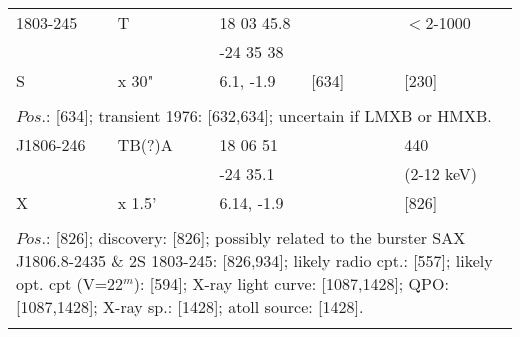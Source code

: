 \documentclass{aa}
\begin{document}
\begin{tabular}{p{2.5cm}p{1cm}p{1.8cm}p{2.3cm}p{3.3cm}p{2.0cm}p{2.2cm}}
\noalign{\smallskip}
1803-245        & T                  & 18 03 45.8         &                      &                          & $<$2-1000      &            \\
                         &                      & -24 35 38           &                      &                          &                          &            \\
      S                & x 30"            & 6.1, -1.9             &  [634]           &                          & [230]                &            \\
\\
\multicolumn{7}{p{17.5cm}}{
$Pos$.: [634]; transient 1976: [632,634]; uncertain if LMXB or HMXB.}\\
\noalign{\smallskip}
\hline

\noalign{\smallskip}
J1806-246     & TB(?)A  & 18 06 51   &                  &                         & 440                  &          \\
                        &                 & -24 35.1    &                 &                          & (2-12 keV)      &          \\
X                     & x 1.5'       & 6.14, -1.9  &                 &                          & [826]                &         \\
\\
\multicolumn{7}{p{17.5cm}}{
$Pos$.: [826]; discovery: [826]; possibly related to the burster SAX J1806.8-2435 \& 2S 1803-245: [826,934]; likely 
radio cpt.: [557]; likely opt. cpt (V=22$^m$): [594]; X-ray light curve: [1087,1428]; QPO: [1087,1428]; X-ray sp.: [1428]; 
atoll source: [1428].}\\
\noalign{\smallskip}
\hline


\end{tabular}
\end{document}
